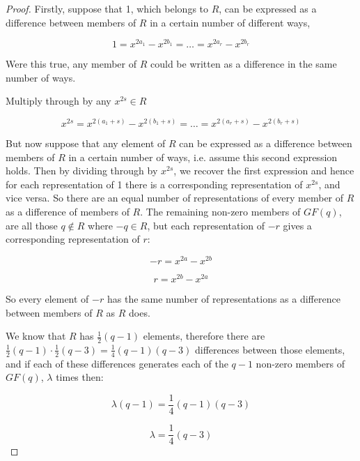 \documentclass[
  11pt,
  a4paper]{book}
\begin{document}
\begin{proof}
Firstly, suppose that 1, which belongs to $R$, can be
expressed as a difference between members of $R$ in a
certain number of different ways,

\begin{equation}
1 = x^{2a_1} - x^{2b_1} = \ldots = x^{2a_r} - x^{2b_r}
\end{equation}

Were this true, any member of $R$ could be written as a
difference in the same number of ways.

Multiply through by any $x^{2s} \in R$

\begin{equation}
x^{2s} = x^{2(a_1 + s)} - x^{2(b_1 + s)} = \ldots = x^{2(a_r + s)} - x^{2(b_r + s)}
\end{equation}

But now suppose that any element of $R$ can be expressed as
a difference between members of $R$ in a certain number of
ways, i.e. assume this second expression holds. Then by
dividing through by $x^{2s}$, we recover the first
expression and hence for each representation of 1 there is a
corresponding representation of $x^{2s}$, and vice versa. So
there are an equal number of representations of every member
of $R$ as a difference of members of $R$. The remaining
non-zero members of $GF(q)$, are all those $q \notin R$
where $-q \in R$, but each representation of $-r$ gives a
corresponding representation of $r$:

\begin{equation}
-r = x^{2a} - x^{2b}
\end{equation}

\begin{equation}
r = x^{2b} - x^{2a}
\end{equation}

So every element of $-r$ has the same number of
representations as a difference between members of $R$ as
$R$ does.

We know that $R$ has $\frac{1}{2}(q-1)$ elements, therefore
there are
$\frac{1}{2}(q-1) \cdot \frac{1}{2} (q-3) = \frac{1}{4}(q-1)(q-3)$
differences between those elements,
and if each of these differences generates each of the $q-1$
non-zero members of $GF(q)$, $\lambda$ times then:

\begin{equation}
\lambda(q - 1) = \frac{1}{4}(q - 1)(q - 3)
\end{equation}

\begin{equation}
\lambda = \frac{1}{4}(q - 3)
\end{equation}


\end{proof}
\end{document}
